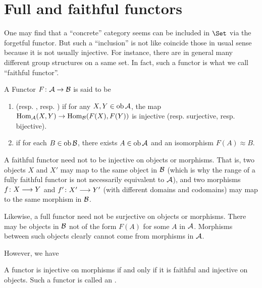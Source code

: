 \newpage\section{Full and faithful functors}
  One may find that a ``concrete'' category seems can be included in $\Set$ via the forgetful functor. But such a ``inclusion'' is not like coincide those in usual sense because it is not usually injective. For instance, there are in general many different group structures on a same set. In fact, such a functor is what we call ``faithful functor''.
  \begin{defn}
  A Functor $F\colon {\cal A}\to{\cal B}$ is said to be
  \begin{enumerate}
    \item {} (resp. , resp. ) if for any $X,Y\in\operatorname{ob}{\cal A}$, the map $\operatorname{Hom}_{{\cal A}}(X,Y)\to\operatorname{Hom}_{{\cal B}}(F(X),F(Y))$ is injective (resp. surjective, resp. bijective).
    \item {} if for each $B\in\operatorname{ob}{\cal B}$, there exists $A\in\operatorname{ob}{\cal A}$ and an isomorphism $F(A)\approx B$.
  \end{enumerate}
  \end{defn}
  \begin{rem}
  A faithful functor need not to be injective on objects or morphisms. That is, two objects $X$ and $X'$ may map to the same object in ${\cal B}$ (which is why the range of a fully faithful functor is not necessarily equivalent to ${\cal A}$),
  and two morphisms $f \colon X\longrightarrow Y$ and $f' \colon X'\longrightarrow Y'$ (with different domains and codomains) may map to the same morphism in ${\cal B}$.

  Likewise, a full functor need not be surjective on objects or morphisms. There may be objects in ${\cal B}$ not of the form $F(A)$ for some $A$ in ${\cal A}$. Morphisms between such objects clearly cannot come from morphisms in ${\cal A}$.
  \end{rem}

  However, we have
  \begin{prop}
    A functor is injective on morphisms if and only if it is faithful and injective on objects.
    Such a functor is called an .
  \end{prop}

